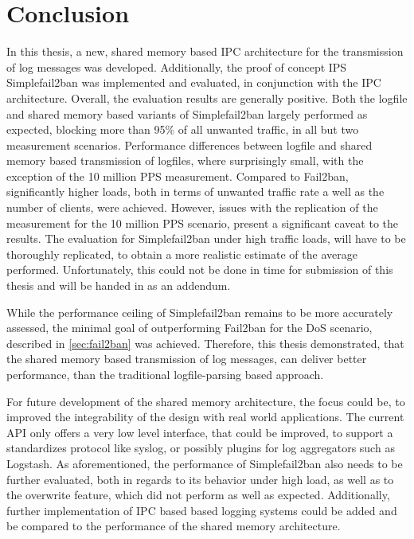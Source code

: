 %
%
\chapter{Conclusion}

In this thesis, a new, shared memory based \ac{IPC} architecture for the transmission of log messages was developed.
Additionally, the proof of concept \ac{IPS} Simplefail2ban was implemented and evaluated, in conjunction with the \ac{IPC} architecture.
Overall, the evaluation results are generally positive. Both the  logfile and shared memory based variants of Simplefail2ban largely performed as expected, blocking more than 95\% of all unwanted
traffic, in all but two measurement scenarios. Performance differences between logfile and shared memory
based transmission of logfiles, where surprisingly small, with the exception of the 10 million \ac{PPS} measurement.
Compared to Fail2ban, significantly higher loads, both in terms of unwanted traffic 
rate a well as the number of clients, were achieved. However, issues with the replication
of the measurement for the 10 million \ac{PPS} scenario, present a significant caveat to the results. The
evaluation for Simplefail2ban under high traffic loads, will have to be thoroughly replicated, to obtain a more 
realistic estimate of the average performed. Unfortunately, this could not be done in time for submission of this thesis
and will be handed in as an addendum. 
\par
While the performance ceiling of Simplefail2ban remains to be more accurately assessed, 
the minimal goal of outperforming Fail2ban for the \ac{DoS} scenario, described in \ref{sec:fail2ban}
was achieved. Therefore, this thesis demonstrated, that the shared memory based transmission of log messages, can
deliver better performance, than the traditional logfile-parsing based approach.
\par 
For future development of the shared memory architecture, the focus could be, to 
improved the integrability of the design with real world applications. The current \ac{API}
only offers a very low level interface, that could be improved, to support a standardizes protocol like syslog, or possibly
plugins for log aggregators such as Logstash. As aforementioned, the performance of Simplefail2ban also needs
to be further evaluated, both in regards to its behavior under high load, as well as to the overwrite feature, which
did not perform as well as expected. Additionally, further implementation of \ac{IPC} based based logging systems could be added
and be compared to the performance of the shared memory architecture.
